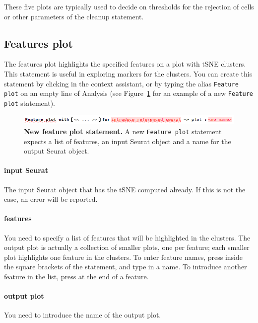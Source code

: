 These five plots are typically used to decide on thresholds for the rejection
of cells or other parameters of the cleanup statement.

\subsection{Features plot}
The features plot highlights the specified features on a plot with tSNE clusters. This statement
is useful in exploring markers for the clusters.
You can create this statement by clicking
 in the context assistant, or by typing
the alias \texttt{Feature plot} on an empty line of Analysis (see Figure~\ref{fig:FeaturesPlot}
for an example of a new \texttt{Feature plot} statement).

\begin{figure}[h!tbp]
  \centering
  \includegraphics[width=\figWidthWide]{figures/FeaturesPlot.png}
    \caption[New feature plot statement.]{\textbf{New feature plot statement.} A new
    \texttt{Feature plot} statement expects a list of features, an input Seurat object
    and a name for the output Seurat object.}
\label{fig:FeaturesPlot}
\end{figure}

\paragraph{input Seurat} The input Seurat object that has the tSNE computed already. If this
is not the case, an error will be reported.

\paragraph{features} You need to specify a list of features that will be highlighted in the
clusters. The output plot is actually a collection of smaller plots, one per feature; each
smaller plot highlights one feature in the clusters. To enter feature names, press \keys{\return}
inside the square brackets of the statement, and type in a name. To introduce another
feature in the list, press \keys{\return} at the end of a feature.

\paragraph{output plot} You need to introduce the name of the output plot.

